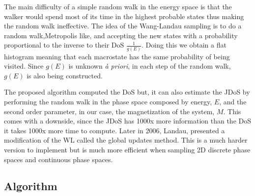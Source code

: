 The main difficulty of a simple random walk in the energy space is that the walker would spend most of its time in the highest probable states thus making the random walk ineffective. The idea of the Wang-Landau sampling is to do a random walk,Metropolis like, and accepting the new states with a probability proportional to the inverse to their DoS $\frac{1}{g(E)}$. Doing this we obtain a flat histogram meaning that each macrostate has the same probability of being visited.  
Since $g(E)$ is unknown \textit{à priori}, in each step of the random walk, $g(E)$ is also being constructed.

The proposed algorithm computed the DoS but, it can also estimate the JDoS by performing the random walk in the phase space composed by energy, $E$, and the second order parameter, in our case, the magnetization of the system, $M$. This comes with a downside, since the JDoS has 1000x more information than the DoS it takes 1000x more time to compute.
Later in 2006, Landau, presented a modification of the WL called the global updates method. This is a much harder version to implement but is much more efficient when sampling 2D discrete phase spaces and continuous phase spaces. 

\subsection{Algorithm}

